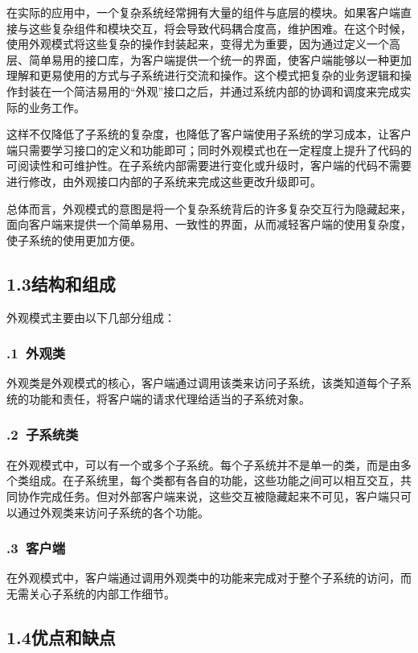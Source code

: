 \documentclass[24pt,a4paper]{article}%
\begin{document}
在实际的应用中，一个复杂系统经常拥有大量的组件与底层的模块。如果客户端直接与这些复杂组件和模块交互，将会导致代码耦合度高，维护困难。在这个时候，使用外观模式将这些复杂的操作封装起来，变得尤为重要，因为通过定义一个高层、简单易用的接口库，为客户端提供一个统一的界面，使客户端能够以一种更加理解和更易使用的方式与子系统进行交流和操作。这个模式把复杂的业务逻辑和操作封装在一个简洁易用的“外观”接口之后，并通过系统内部的协调和调度来完成实际的业务工作。

这样不仅降低了子系统的复杂度，也降低了客户端使用子系统的学习成本，让客户端只需要学习接口的定义和功能即可；同时外观模式也在一定程度上提升了代码的可阅读性和可维护性。在子系统内部需要进行变化或升级时，客户端的代码不需要进行修改，由外观接口内部的子系统来完成这些更改升级即可。

总体而言，外观模式的意图是将一个复杂系统背后的许多复杂交互行为隐藏起来，面向客户端来提供一个简单易用、一致性的界面，从而减轻客户端的使用复杂度，使子系统的使用更加方便。
\subsection*{\songti 1.3结构和组成}
外观模式主要由以下几部分组成：
\subsubsection*{.1\ 外观类}
外观类是外观模式的核心，客户端通过调用该类来访问子系统，该类知道每个子系统的功能和责任，将客户端的请求代理给适当的子系统对象。
\subsubsection*{.2\ 子系统类}
在外观模式中，可以有一个或多个子系统。每个子系统并不是单一的类，而是由多个类组成。在子系统里，每个类都有各自的功能，这些功能之间可以相互交互，共同协作完成任务。但对外部客户端来说，这些交互被隐藏起来不可见，客户端只可以通过外观类来访问子系统的各个功能。
\subsubsection*{.3\ 客户端}
在外观模式中，客户端通过调用外观类中的功能来完成对于整个子系统的访问，而无需关心子系统的内部工作细节。
\subsection*{\songti 1.4优点和缺点}
\end{document}
